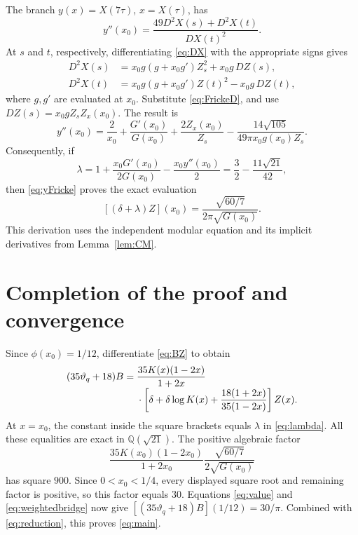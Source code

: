 \documentclass[11pt,a4paper]{article}
\theoremstyle{remark}
\newcommand{\tht}{\vartheta}
\begin{document}
The branch $y(x)=X(7\tau)$, $x=X(\tau)$, has
\[
 y''(x_0)=\frac{49D^2X(s)+D^2X(t)}{DX(t)^2}.
\]
At $s$ and $t$, respectively, differentiating \eqref{eq:DX} with the
appropriate signs gives
\begin{align*}
 D^2X(s)&=x_0g(g+x_0g')Z_s^2+x_0g\,DZ(s),\\
 D^2X(t)&=x_0g(g+x_0g')Z(t)^2-x_0g\,DZ(t),
\end{align*}
where $g,g'$ are evaluated at $x_0$. Substitute
\eqref{eq:FrickeD}, and use $DZ(s)=x_0gZ_sZ_x(x_0)$. The result is
\begin{equation}\label{eq:yFricke}
 y''(x_0)=\frac2{x_0}+\frac{G'(x_0)}{G(x_0)}
     +\frac{2Z_x(x_0)}{Z_s}
     -\frac{14\sqrt{105}}{49\pi x_0g(x_0)Z_s}.
\end{equation}
Consequently, if
\begin{equation}\label{eq:lambda}
 \lambda=1+\frac{x_0G'(x_0)}{2G(x_0)}-\frac{x_0y''(x_0)}2
         =\frac32-\frac{11\sqrt{21}}{42},
\end{equation}
then \eqref{eq:yFricke} proves the exact evaluation
\begin{equation}\label{eq:value}
 [ (\delta+\lambda)Z ](x_0)
       =\frac{\sqrt{60/7}}{2\pi\sqrt{G(x_0)}}.
\end{equation}
This derivation uses the independent modular equation and its implicit
derivatives from Lemma~\ref{lem:CM}.

\section{Completion of the proof and convergence}
Since $\phi(x_0)=1/12$, differentiate \eqref{eq:BZ} to obtain
\begin{align}\label{eq:weightedbridge}
(35\tht_q+18)B
={}&\frac{35K(x)(1-2x)}{1+2x}\notag\\[-1mm]
 &\cdot\left[\delta+\delta\log K(x)
                   +\frac{18(1+2x)}{35(1-2x)}\right]Z(x).
\end{align}
At $x=x_0$, the constant inside the square brackets equals
$\lambda$ in \eqref{eq:lambda}. All these equalities are exact in
$\mathbb Q(\sqrt{21})$. The positive algebraic factor
\[
 \frac{35K(x_0)(1-2x_0)}{1+2x_0}
               \frac{\sqrt{60/7}}{2\sqrt{G(x_0)}}
\]
has square $900$. Since $0<x_0<1/4$, every displayed square root
and remaining factor is positive, so this factor equals $30$.
Equations \eqref{eq:value} and \eqref{eq:weightedbridge} now give
$[(35\tht_q+18)B](1/12)=30/\pi$. Combined with
\eqref{eq:reduction}, this proves \eqref{eq:main}.
\end{document}
